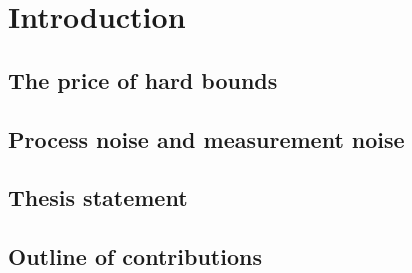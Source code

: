 
\section{Introduction}
\label{p3:sec:intro}

\subsection{The price of hard bounds}
\label{p3:sub:price_of_hard_bounds}

\subsection{Process noise and measurement noise}
\label{p3:sub:process_and_measurement_noise}

\subsection{Thesis statement}
\label{p3:sub:thesis_statement}

\subsection{Outline of contributions}
\label{p3:sub:outline_of_contributions}
